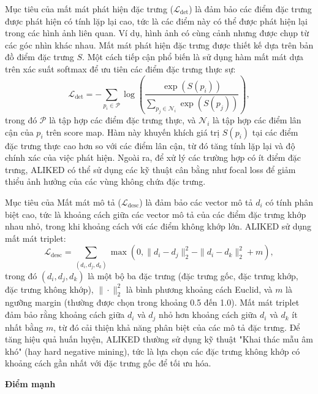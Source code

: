 \begin{itemize}
   Mục tiêu của mất mát phát hiện đặc trưng (\( \mathcal{L}_{\text{det}} \)) là đảm bảo các điểm đặc trưng được phát hiện có tính lặp lại cao, tức là các điểm này có thể được phát hiện lại trong các hình ảnh liên quan. Ví dụ, hình ảnh có cùng cảnh nhưng được chụp từ các góc nhìn khác nhau. Mất mát phát hiện đặc trưng được thiết kế dựa trên bản đồ điểm đặc trưng \( S \). Một cách tiếp cận phổ biến là sử dụng hàm mất mát dựa trên xác suất softmax để ưu tiên các điểm đặc trưng thực sự:
   \begin{equation}
       \mathcal{L}_{\text{det}} = -\sum_{p_i \in \mathcal{P}} \log \left( \frac{\exp(S(p_i))}{\sum_{p_j \in \mathcal{N}_i} \exp(S(p_j))} \right),
   \end{equation}
   trong đó \( \mathcal{P} \) là tập hợp các điểm đặc trưng thực, và \( \mathcal{N}_i \) là tập hợp các điểm lân cận của \( p_i \) trên score map. Hàm này khuyến khích giá trị \( S(p_i) \) tại các điểm đặc trưng thực cao hơn so với các điểm lân cận, từ đó tăng tính lặp lại và độ chính xác của việc phát hiện. Ngoài ra, để xử lý các trường hợp có ít điểm đặc trưng, ALIKED có thể sử dụng các kỹ thuật cân bằng như focal loss để giảm thiểu ảnh hưởng của các vùng không chứa đặc trưng.

   Mục tiêu của Mất mát mô tả (\( \mathcal{L}_{\text{desc}} \)) là đảm bảo các vector mô tả \( d_i \) có tính phân biệt cao, tức là khoảng cách giữa các vector mô tả của các điểm đặc trưng khớp nhau nhỏ, trong khi khoảng cách với các điểm không khớp lớn. ALIKED sử dụng mất mát triplet:
   \begin{equation}
       \mathcal{L}_{\text{desc}} = \sum_{(d_i, d_j, d_k)} \max \left( 0, \| d_i - d_j \|_2^2 - \| d_i - d_k \|_2^2 + m \right),
   \end{equation}
   trong đó \( (d_i, d_j, d_k) \) là một bộ ba đặc trưng (đặc trưng gốc, đặc trưng khớp, đặc trưng không khớp), \( \| \cdot \|_2^2 \) là bình phương khoảng cách Euclid, và \( m \) là ngưỡng margin (thường được chọn trong khoảng 0.5 đến 1.0). Mất mát triplet đảm bảo rằng khoảng cách giữa \( d_i \) và \( d_j \) nhỏ hơn khoảng cách giữa \( d_i \) và \( d_k \) ít nhất bằng \( m \), từ đó cải thiện khả năng phân biệt của các mô tả đặc trưng. Để tăng hiệu quả huấn luyện, ALIKED thường sử dụng kỹ thuật "Khai thác mẫu âm khó" (hay hard negative mining), tức là lựa chọn các đặc trưng không khớp có khoảng cách gần nhất với đặc trưng gốc để tối ưu hóa.
\end{itemize}

\textbf{Điểm mạnh}

